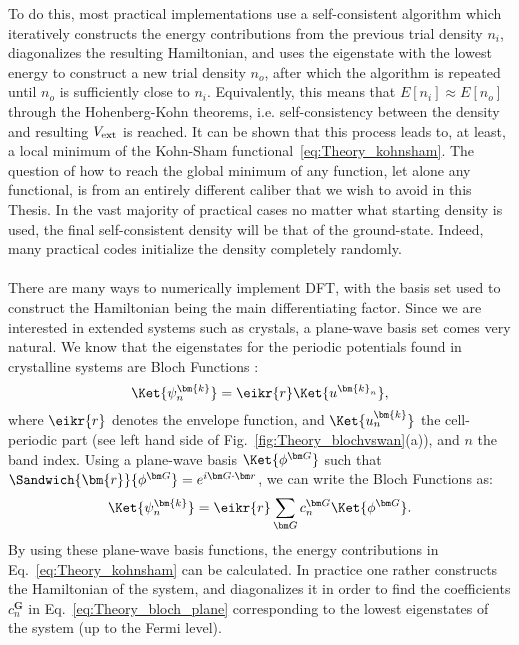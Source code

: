 To do this, most practical implementations use a self-consistent algorithm which iteratively constructs the energy contributions from the previous trial density $n_i$, diagonalizes the resulting Hamiltonian, and uses the eigenstate with the lowest energy to construct a new trial density $n_o$, after which the algorithm is repeated until $n_o$ is sufficiently close to $n_i$. Equivalently, this means that $E[n_i] \approx E[n_o]$ through the Hohenberg-Kohn theorems, i.e. self-consistency between the density and resulting $V_{\rm ext}$ is reached.
It can be shown that this process leads to, at least, a local minimum of the Kohn-Sham functional~\eqref{eq:Theory_kohnsham}.
The question of how to reach the global minimum of any function, let alone any functional, is from an entirely different caliber that we wish to avoid in this Thesis.
In the vast majority of practical cases no matter what starting density is used, the final self-consistent density will be that of the ground-state. Indeed, many practical codes initialize the density completely randomly. 
\\\\
There are many ways to numerically implement DFT, with the basis set used to construct the Hamiltonian being the main differentiating factor.
Since we are interested in extended systems such as crystals, a plane-wave basis set comes very natural.
We know that the eigenstates for the periodic potentials found in crystalline systems are Bloch Functions \cite{Ashcroft}:
\begin{equation}
	\Ket{\psi^{\bm{k}}_n} = \eikr{r} \Ket{u^{\bm{k}_n}},
\end{equation}
where $\eikr{r}$ denotes the envelope function, and $\Ket{u^{\bm{k}}_n}$ the cell-periodic part (see left hand side of Fig.~\ref{fig:Theory_blochvswan}(a)), and $n$ the band index.
Using a plane-wave basis $\Ket{\phi^{\bm G}}$ such that $\Sandwich{\bm{r}}{\phi^{\bm G}} = e^{i\bm G \cdot \bm r}$, we can write the Bloch Functions as:
\begin{equation}
	\label{eq:Theory_bloch_plane}
\Ket{\psi_n^{\bm{k}}} = \eikr{r} \sum_{\bm G} c_n^{\bm G} \Ket{\phi^{\bm G}}.
\end{equation}
By using these plane-wave basis functions, the energy contributions in Eq.~\eqref{eq:Theory_kohnsham} can be calculated.
In practice one rather constructs the Hamiltonian of the system, and diagonalizes it in order to find the coefficients $c_n^{\bm G}$ in Eq.~\eqref{eq:Theory_bloch_plane} corresponding to the lowest eigenstates of the system (up to the Fermi level).

